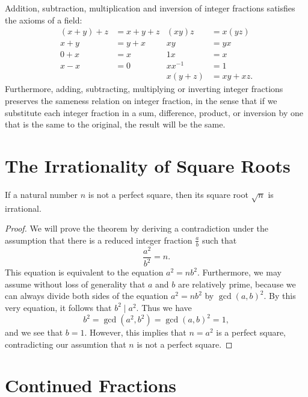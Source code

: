 \begin{theorem}
  Addition, subtraction, multiplication and inversion of integer fractions satisfies the axioms of a field:
  \begin{align*}
    (x+y)+z & = x + y+ z & (xy)z & = x(yz) \\
    x+y & = y+x & xy &= yx \\
    0+x & = x & 1x & = x \\
    x-x & = 0 & xx^{-1} & = 1 \\
    & & x(y+z) & = xy+xz.
  \end{align*}
  Furthermore, adding, subtracting, multiplying or inverting integer fractions preserves the sameness relation on integer fraction, in the sense that if we substitute each integer fraction in a sum, difference, product, or inversion by one that is the same to the original, the result will be the same.
\end{theorem}

\section{The Irrationality of Square Roots}

\begin{theorem}\label{theorem:irrational-sqrt}
  If a natural number $n$ is not a perfect square, then its square root $\sqrt{n}$ is irrational.
\end{theorem}

\begin{proof}
  We will prove the theorem by deriving a contradiction under the assumption that there is a reduced integer fraction $\frac{a}{b}$ such that
  \begin{equation*}
    \frac{a^2}{b^2}=n.
  \end{equation*}
  This equation is equivalent to the equation $a^2=nb^2$. Furthermore, we may assume without loss of generality that $a$ and $b$ are relatively prime, because we can always divide both sides of the equation $a^2=n b^2$ by $\gcd(a,b)^2$. By this very equation, it follows that $b^2\mid a^2$. Thus we have
  \begin{equation*}
    b^2=\gcd(a^2,b^2)=\gcd(a,b)^2=1,
  \end{equation*}
  and we see that $b=1$. However, this implies that $n=a^2$ is a perfect square, contradicting our assumtion that $n$ is not a perfect square.
\end{proof}

\section{Continued Fractions}

